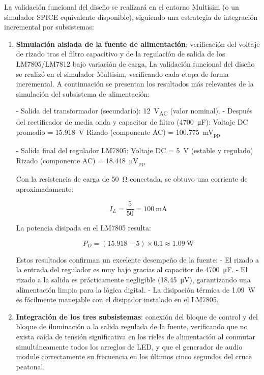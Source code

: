 \documentclass[10pt,onecolumn]{IEEEtran}
\begin{document}
La validación funcional del diseño se realizará en el entorno Multisim (o un simulador SPICE equivalente disponible), siguiendo una estrategia de integración incremental por subsistemas:

\begin{enumerate}
    \item \textbf{Simulación aislada de la fuente de alimentación}: verificación del voltaje de rizado tras el filtro capacitivo y de la regulación de salida de los LM7805/LM7812 bajo variación de carga,
La validación funcional del diseño se realizó en el simulador Multisim, verificando cada etapa de forma incremental. A continuación se presentan los resultados más relevantes de la simulación del subsistema de alimentación:

- Salida del transformador (secundario): \SI{12}{\volt_{AC}} (valor nominal).
- Después del rectificador de media onda y capacitor de filtro (\SI{4700}{\micro\farad}):  
  Voltaje DC promedio = \SI{15.918}{\volt}  
  Rizado (componente AC) = \SI{100.775}{\milli\volt_{pp}}

- Salida final del regulador LM7805:  
  Voltaje DC = \SI{5}{\volt} (estable y regulado)  
  Rizado (componente AC) = \SI{18.448}{\micro\volt_{pp}}

Con la resistencia de carga de \SI{50}{\ohm} conectada, se obtuvo una corriente de aproximadamente:

\[
I_L = \frac{5}{50} = \SI{100}{\milli\ampere}
\]

La potencia disipada en el LM7805 resulta:

\[
P_D = (15.918 - 5) \times 0.1 \approx \SI{1.09}{\watt}
\]

Estos resultados confirman un excelente desempeño de la fuente:
- El rizado a la entrada del regulador es muy bajo gracias al capacitor de \SI{4700}{\micro\farad}.
- El rizado a la salida es prácticamente negligible (\SI{18.45}{\micro\volt}), garantizando una alimentación limpia para la lógica digital.
- La disipación térmica de \SI{1.09}{\watt} es fácilmente manejable con el disipador instalado en el LM7805.
    \item \textbf{Integración de los tres subsistemas}: conexión del bloque de control y del bloque de iluminación a la salida regulada de la fuente, verificando que no exista caída de tensión significativa en los rieles de alimentación al conmutar simultáneamente todos los arreglos de LED, y que el generador de audio module correctamente su frecuencia en los últimos cinco segundos del cruce peatonal.
\end{enumerate}
\end{document}
